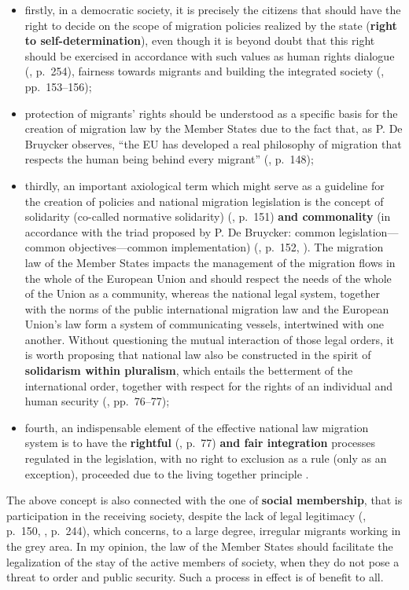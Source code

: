 \documentclass[10pt,a4paper]{article}
\begin{document}
\begin{multicols}{2}
\begin{itemize}
\item firstly, in a democratic society, it is precisely the citizens that should have the right to decide on the scope of migration policies realized by the state (\textbf{right to self-determination}), even though it is beyond doubt that this right should be exercised in accordance with such values as human rights dialogue (\citep{R17}, p.~254), fairness towards migrants and building the integrated society (\citep{R18}, pp.~153--156);
\item protection of migrants' rights should be understood as a specific basis for the creation of migration law by the Member States due to the fact that, as P. De Bruycker observes, ``the EU has developed a real philosophy of migration that respects the human being behind every migrant'' (\citep{R19}, p.~148);
\item thirdly, an important axiological term which might serve as a guideline for the creation of policies and national migration legislation is the concept of solidarity (co-called normative solidarity) (\citep{R19}, p.~151) \textbf{and commonality} (in accordance with the triad proposed by P. De Bruycker: common legislation---common objectives---common implementation) (\citep{R19}, p.~152, \citep{R20}). The migration law of the Member States impacts the management of the migration flows in the whole of the European Union and should respect the needs of the whole of the Union as a community, whereas the national legal system, together with the norms of the public international migration law and the European Union's law form a system of communicating vessels, intertwined with one another. Without questioning the mutual interaction of those legal orders, it is worth proposing that national law also be constructed in the spirit of \textbf{solidarism within pluralism}, which entails the betterment of the international order, together with respect for the rights of an individual and human security (\citep{R21}, pp.~76--77);
\item fourth, an indispensable element of the effective national law migration system is to have the \textbf{rightful} (\citep{R22}, p.~77) \textbf{and fair integration} processes regulated in the legislation, with no right to exclusion as a rule (only as an exception), proceeded due to the living together principle \citep{R23,R24,R25}.
\end{itemize}

The above concept is also connected with the one of \textbf{social membership}, that is participation in the receiving society, despite the lack of legal legitimacy (\citep{R26}, p.~150, \citep{R27}, p.~244), which concerns, to a large degree, irregular migrants working in the grey area. In my opinion, the law of the Member States should facilitate the legalization of the stay of the active members of society, when they do not pose a threat to order and public security. Such a process in effect is of benefit to all.


\end{multicols}
\end{document}
